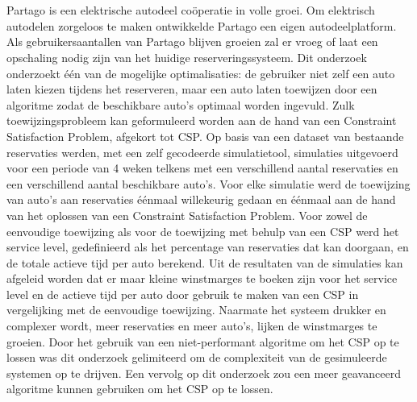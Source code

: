 \chapter*{}
Partago is een elektrische autodeel coöperatie in volle groei. Om elektrisch autodelen zorgeloos te maken ontwikkelde Partago een eigen autodeelplatform. Als gebruikersaantallen van Partago blijven groeien zal er vroeg of laat een opschaling nodig zijn van het huidige reserveringssysteem. Dit onderzoek onderzoekt één van de mogelijke optimalisaties: de gebruiker niet zelf een auto laten kiezen tijdens het reserveren, maar een auto laten toewijzen door een algoritme zodat de beschikbare auto's optimaal worden ingevuld. Zulk toewijzingsprobleem kan geformuleerd worden aan de hand van een Constraint Satisfaction Problem, afgekort tot CSP. Op basis van een dataset van bestaande reservaties werden, met een zelf gecodeerde simulatietool, simulaties uitgevoerd voor een periode van 4 weken telkens met een verschillend aantal reservaties en een verschillend aantal beschikbare auto's. Voor elke simulatie werd de toewijzing van auto's aan reservaties éénmaal willekeurig gedaan en éénmaal aan de hand van het oplossen van een Constraint Satisfaction Problem. Voor zowel de eenvoudige toewijzing als voor de toewijzing met behulp van een CSP werd het service level, gedefinieerd als het percentage van reservaties dat kan doorgaan, en de totale actieve tijd per auto berekend. Uit de resultaten van de simulaties kan afgeleid worden dat er maar kleine winstmarges te boeken zijn voor het service level en de actieve tijd per auto door gebruik te maken van een CSP in vergelijking met de eenvoudige toewijzing. Naarmate het systeem drukker en complexer wordt, meer reservaties en meer auto's, lijken de winstmarges te groeien. Door het gebruik van een niet-performant algoritme om het CSP op te lossen was dit onderzoek gelimiteerd om de complexiteit van de gesimuleerde systemen op te drijven. Een vervolg op dit onderzoek zou een meer geavanceerd algoritme kunnen gebruiken om het CSP op te lossen.
